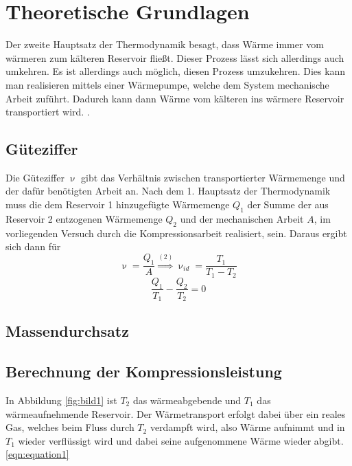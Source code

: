 \section{Theoretische Grundlagen}
\label{sec:Theorie}

Der zweite Hauptsatz der Thermodynamik besagt, dass Wärme immer vom wärmeren zum kälteren Reservoir fließt. Dieser Prozess lässt sich allerdings auch umkehren.
Es ist allerdings auch möglich, diesen Prozess umzukehren. Dies kann man realisieren mittels einer Wärmepumpe, welche dem System mechanische Arbeit zuführt. Dadurch kann dann
Wärme vom kälteren ins wärmere Reservoir transportiert wird.
.

\subsection {Güteziffer}
\label{sec:güteziffer}
Die Güteziffer $\upnu$ gibt das Verhältnis zwischen transportierter Wärmemenge und der dafür benötigten Arbeit an. Nach dem 1. Hauptsatz der Thermodynamik muss die dem Reservoir 1 hinzugefügte Wärmemenge $Q_1$
der Summe der aus Reservoir 2 entzogenen Wärmemenge $Q_2$ und der mechanischen Arbeit $A$, im vorliegenden Versuch durch die Kompressionsarbeit realisiert, sein.
Daraus ergibt sich dann für
\begin{equation}
  \label{eqn:equation1}
  \upnu=\frac{Q_1}{A}\stackrel{(2)}{\Rightarrow} \upnu_{id}=\frac{T_1}{T_1-T_2}
\end{equation}
\begin{equation}
  \frac{Q_1}{T_1}-\frac{Q_2}{T_2}=0\label{eqn:equation2}
\end{equation}
\subsection {Massendurchsatz}
\label{sec:massendurchsatz}
\subsection {Berechnung der Kompressionsleistung}
\label{sec:kompressorleistung}


In Abbildung \ref{fig:bild1} ist $T_2$ das wärmeabgebende und $T_1$ das wärmeaufnehmende Reservoir. Der Wärmetransport erfolgt dabei über ein reales Gas, welches beim Fluss durch $T_2$ verdampft wird, also Wärme aufnimmt
und in $T_1$ wieder verflüssigt wird und dabei seine aufgenommene Wärme wieder abgibt. \eqref{eqn:equation1}







\cite{Anleitung}
